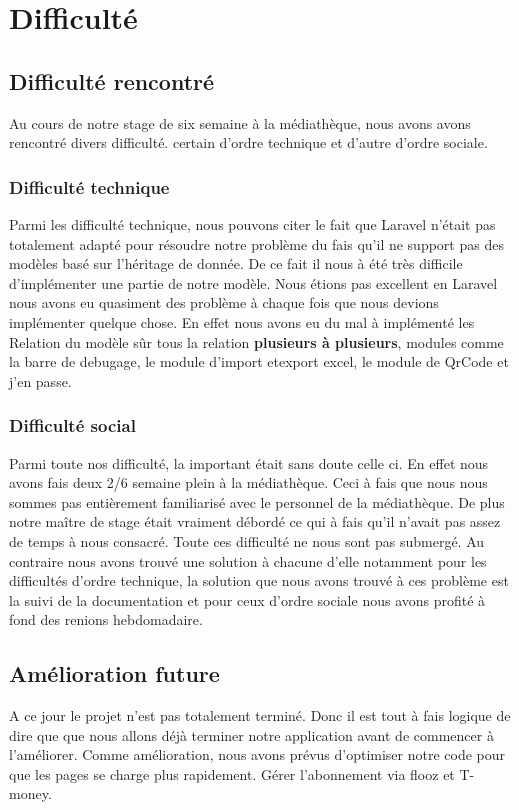 \documentclass[12pt,a4paper]{article}
\begin{document}
\section{Difficulté}
\subsection{Difficulté rencontré}
Au cours de notre stage de six semaine à la médiathèque, nous avons avons rencontré divers 
difficulté. certain d'ordre technique et d'autre d'ordre sociale.
\subsubsection{Difficulté technique}
Parmi les difficulté technique, nous pouvons citer le fait que Laravel n'était pas totalement
adapté pour résoudre notre problème du fais qu'il ne support pas des modèles basé sur l'héritage
de donnée. De ce fait il nous à été très difficile d'implémenter une partie de notre modèle.
Nous étions pas excellent en Laravel nous avons eu quasiment des problème à chaque
fois que nous devions implémenter quelque chose. En effet nous avons eu du mal à implémenté les 
Relation du modèle sûr tous la relation \textbf{plusieurs à plusieurs}, modules comme la barre 
de debugage, le module d'import etexport excel, le module de QrCode et j'en passe. 

\subsubsection{Difficulté social} 
Parmi toute nos difficulté, la important était sans doute celle ci. En effet nous avons
fais deux 2/6 semaine plein à la médiathèque. Ceci à fais que nous nous sommes pas 
entièrement familiarisé avec le personnel de la médiathèque. De plus notre maître 
de stage était vraiment débordé ce qui à fais qu'il n'avait pas assez de temps à nous
consacré.
Toute ces difficulté ne nous sont pas submergé. Au contraire nous avons trouvé une 
solution à chacune d'elle notamment pour les difficultés d'ordre technique, la solution 
que nous avons trouvé à ces problème est la suivi de la documentation et pour ceux 
d'ordre sociale nous avons profité à fond des renions hebdomadaire.

\subsection{Amélioration future}
A ce jour le projet n'est pas totalement terminé. Donc il est tout à fais logique de dire que
que nous allons déjà terminer notre application avant de commencer à l'améliorer.
Comme amélioration, nous avons prévus d'optimiser notre code pour que les pages se charge 
plus rapidement. Gérer l'abonnement via flooz et T-money.
\end{document}
